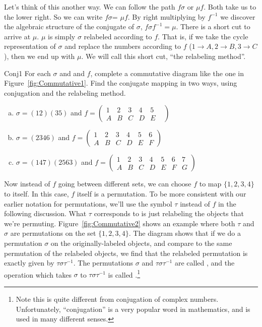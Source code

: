 Let's think of this another way. We can follow the path $f\sigma$ or $\mu f$.  Both take us to the lower right. 
 So we can write $f\sigma$= $\mu f$. By right multiplying by $f^{-1}$ we discover the algebraic structure of the conjugate of $\sigma$,  $f\sigma f^{-1}=\mu$.  
There is a short cut to arrive at $\mu$.  $\mu$ is simply $\sigma$ relabeled according to $f$.  That is, if we take the cycle representation of $\sigma$ and replace the numbers according to $f$ ($1\rightarrow A, 2\rightarrow B, 3\rightarrow C$), then we end up with $\mu$.  We will call this short cut, ``the relabeling method''.

\begin{exercise}{Conj1}
For each $\sigma$ and and $f$, complete a commutative diagram like the one in Figure~\ref{fig:Commutative1}. Find the conjugate mapping in two ways, using conjugation and the relabeling method.
\begin{enumerate}[(a)]
\item $\sigma=(12)(35)$ and $f=\begin{pmatrix} 1&2&3&4&5\\ A&B&C&D&E& \end{pmatrix} $
\item $\sigma=(2346)$ and $f=\begin{pmatrix} 1&2&3&4&5&6\\ A&B&C&D&E&F \end{pmatrix}$
\item $\sigma=(147)(2563)$ and $f=\begin{pmatrix} 1&2&3&4&5&6&7\\ A&B&C&D&E&F&G \end{pmatrix}$
\end{enumerate}
\end {exercise}
Now instead of $f$ going between different sets, we can choose $f$ to map $\{1,2,3,4\}$ to itself. In this case, $f$ itself is a permutation.  To be more consistent with our earlier notation for permutations, we'll use the symbol $\tau$ instead of $f$ in the following discussion.  What $\tau$ corresponds to is just relabeling the objects that we're permuting. Figure~\ref{fig:Commutative2} shows an example where both $\tau$ and $\sigma$ are permutations on the set $\{1,2,3,4\}$. The diagram shows that if we do a permutation $\sigma$ on the originally-labeled objects, and compare to the same permutation of the relabeled objects, we find that the relabeled permutation is exactly given by $\tau\sigma \tau^{-1}$. The permutations $\sigma$ and $\tau\sigma \tau^{-1}$ are called , and the operation which takes $\sigma$ to $\tau \sigma \tau^{-1}$ is called .\footnote{Note this is quite different from conjugation of complex numbers. Unfortunately, ``conjugation'' is a very popular word in mathematics, and is used in many different senses.}

